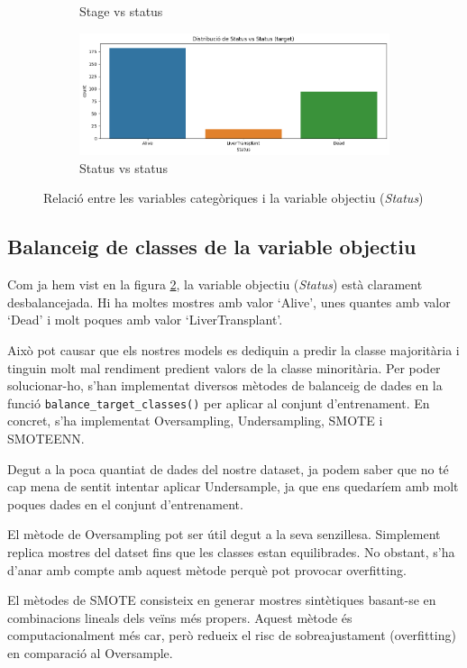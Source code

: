 \begin{figure}[H]
\begin{subfigure}[b]{0.5\textwidth}
    \caption{Stage vs status}
    \label{fig:stage_vs_status}
\end{subfigure}%
\begin{subfigure}[b]{0.5\textwidth}
    \includegraphics[width=\textwidth]{img/corr_Status_vs_status.png}
    \caption{Status vs status}
    \label{fig:status_vs_status}
\end{subfigure}
\caption{Relació entre les variables categòriques i la variable objectiu (\textit{Status})}
\label{fig:cat-target-2}
\end{figure}

\subsection{Balanceig de classes de la variable objectiu}
Com ja hem vist en la figura \ref{fig:status_vs_status}, la variable objectiu (\textit{Status}) està clarament desbalancejada. Hi ha moltes mostres amb valor `Alive', unes quantes amb valor `Dead' i molt poques amb valor `LiverTransplant'.

Això pot causar que els nostres models es dediquin a predir la classe majoritària i tinguin molt mal rendiment predient valors de la classe minoritària. Per poder solucionar-ho, s'han implementat diversos mètodes de balanceig de dades en la funció \texttt{balance\_target\_classes()} per aplicar al conjunt d'entrenament. En concret, s'ha implementat Oversampling, Undersampling, SMOTE i SMOTEENN.

Degut a la poca quantiat de dades del nostre dataset, ja podem saber que no té cap mena de sentit intentar aplicar Undersample, ja que ens quedaríem amb molt poques dades en el conjunt d'entrenament.

El mètode de Oversampling pot ser útil degut a la seva senzillesa. Simplement replica mostres del datset fins que les classes estan equilibrades. No obstant, s'ha d'anar amb compte amb aquest mètode perquè pot provocar overfitting.

El mètodes de SMOTE consisteix en generar mostres sintètiques basant-se en combinacions lineals dels veïns més propers. Aquest mètode és computacionalment més car, però redueix el risc de sobreajustament (overfitting) en comparació al Oversample.


